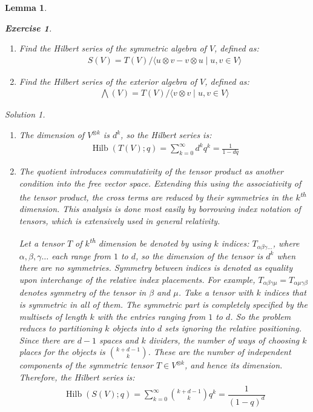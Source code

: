 \documentclass{article}
\newtheorem{Lemma}{Lemma}
\theoremstyle{definition}
\newtheorem{Exercise}{Exercise}
\theoremstyle{remark}
\newtheorem*{Solution*}{Solution}
\theoremstyle{underline}
\theoremstyle{underline}
\DeclareMathOperator{\Hilb}{Hilb}
\renewcommand{\th}{\textsuperscript{th}\xspace}
\begin{document}
\begin{Lemma}
\begin{Exercise}
\begin{enumerate}[label=(\alph*)]
			\item Find the Hilbert series of the \emph{symmetric algebra} of $V$, defined as:
			\begin{gather*}
			 	S(V) = T(V)/\langle u \otimes v - v \otimes u \mid u,v \in V \rangle
			 \end{gather*} 

			\item Find the Hilbert series of the \emph{exterior algebra} of $V$, defined as:
			\begin{gather*}
				\bigwedge(V) = T(V)/\langle v \otimes v \mid u,v \in V \rangle
			\end{gather*}
		\end{enumerate}
	\end{Exercise}
	\begin{Solution*}
		\begin{enumerate}[label=(\alph*)]
			\item The dimension of $V^{\otimes k}$ is $d^k$, so the Hilbert series is:
			\begin{gather*}
				\Hilb(T(V);q) = \sum_{k=0}^{\infty}d^k q^k = \frac{1}{1-dq}
			\end{gather*}
			
			\item The quotient introduces commutativity of the tensor product as another condition into the free vector space. Extending this using the associativity of the tensor product, the cross terms are reduced by their symmetries in the $k$\th dimension. This analysis is done most easily by borrowing index notation of tensors, which is extensively used in general relativity.

			Let a tensor $T$ of $k$\th dimension be denoted by using $k$ indices: $T_{\alpha\beta\gamma\dots}$, where $\alpha,\beta,\gamma \dots$ each range from $1$ to $d$, so the dimension of the tensor is $d^k$ when there are no symmetries. Symmetry between indices is denoted as equality upon interchange of the relative index placements. For example, $T_{\alpha\beta\gamma\mu} = T_{\alpha\mu\gamma\beta}$ denotes symmetry of the tensor in $\beta$ and $\mu$. Take a tensor with $k$ indices that is symmetric in all of them. The symmetric part is completely specified by the multisets of length $k$ with the entries ranging from $1$ to $d$. So the problem reduces to partitioning $k$ objects into $d$ sets ignoring the relative positioning. Since there are $d-1$ spaces and $k$ dividers, the number of ways of choosing $k$ places for the objects is $\binom{k+d-1}{k}$. These are the number of independent components of the symmetric tensor $T \in V^{\otimes k}$, and hence its dimension. Therefore, the Hilbert series is:
			\begin{gather*}
				\Hilb(S(V);q) = \sum_{k=0}^{\infty} \binom{k+d-1}{k} q^k = \dfrac 1 {(1 - q)^d}
			\end{gather*}


\end{enumerate}
\end{Solution*}
\end{Lemma}
\end{document}
